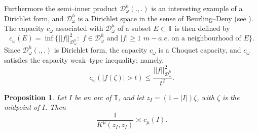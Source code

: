 \documentclass[12pt,reqno,a4paper]{amsart}
\newtheorem{prop}{Proposition}[section]
\newtheorem{theo}[prop]{Theorem}
\newcommand\TT{\mathbb{T}}
\newcommand{\cD}{{\mathcal{D}}}
\numberwithin{equation}{section}
\begin{document}
	Furthermore the semi--inner product $\cD_\omega^h(.,.)$ is an interesting example of a Dirichlet form, and $\cD_\omega^h$ is a Dirichlet space in the sense of Beurling--Deny (see \cite{BD, Fuk}). The capacity $c_\omega$ associated with $\cD_\omega^h$  of a subset $E\subset \TT$ is then defined by 
	$$
	c_\omega(E)=\inf\{||f||^2_{\cD_\omega^h}:\,\,f\in \cD_\omega^h\,\,\text{and}\,\,|f|\geq 1\,\,m-a.e.\,\,\text{on a neighbourhood of}\,\, E\}.
	$$
	Since $\cD_\omega^h(.,.)$ is Dirichlet form, the capacity $c_\omega$ is a Choquet capacity, and $c_\omega$ satisfies the capacity weak--type inequality; namely,  
	$$
	c_\omega\left(|f(\zeta)|>t\right)\leq \frac{||f||^2_{\cD_\omega^h}}{t^2}.
	$$
	\begin{prop}\label{arcestimate}
		Let $I$ be an arc of $\TT$, and let $z_{I}=(1-|I|)\zeta$, with $\zeta$ is the midpoint of $I$. Then 
		\begin{equation*}\label{estimatecap}
			\frac{1}{K^\mu(z_I,z_I)}\asymp c_{\mu}(I).
		\end{equation*}
	\end{prop}
\end{document}
